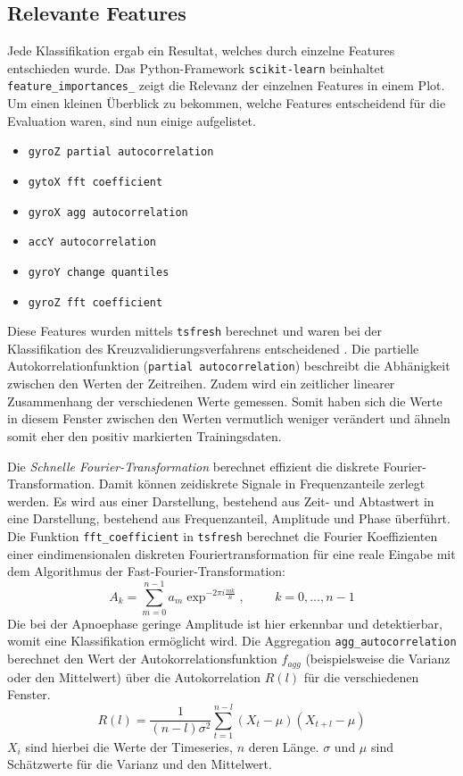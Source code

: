 \subsection{Relevante Features}
Jede Klassifikation ergab ein Resultat, welches durch einzelne Features entschieden wurde. 
Das Python-Framework \texttt{scikit-learn} beinhaltet \texttt{feature\_importances\_} zeigt die Relevanz der einzelnen Features in einem Plot.
Um einen kleinen Überblick zu bekommen, welche Features entscheidend für die Evaluation waren, sind nun einige aufgelistet.
\begin{itemize}
    \item \texttt{gyroZ partial autocorrelation}
    \item \texttt{gytoX fft coefficient}
    \item \texttt{gyroX agg autocorrelation}
    \item \texttt{accY autocorrelation}
    \item \texttt{gyroY change quantiles }
    \item \texttt{gyroZ fft coefficient}
\end{itemize}
Diese Features wurden mittels \texttt{tsfresh} berechnet und waren bei der Klassifikation des Kreuzvalidierungsverfahrens entscheidened \cite{TsfreshTsfresh12}.
Die partielle Autokorrelationfunktion (\texttt{partial autocorrelation}) beschreibt die Abhänigkeit zwischen den Werten der Zeitreihen. 
Zudem wird ein zeitlicher linearer Zusammenhang der verschiedenen Werte gemessen.
Somit haben sich die Werte in diesem Fenster zwischen den Werten vermutlich weniger verändert und ähneln somit eher den positiv markierten Trainingsdaten.

Die \textit{Schnelle Fourier-Transformation} berechnet effizient die diskrete Fourier-Transformation.
Damit können zeidiskrete Signale in Frequenzanteile zerlegt werden. 
Es wird aus einer Darstellung, bestehend aus Zeit- und Abtastwert in eine Darstellung, bestehend aus Frequenzanteil, Amplitude und Phase überführt.
Die Funktion \texttt{fft\_coefficient} in \texttt{tsfresh} berechnet die Fourier Koeffizienten einer eindimensionalen diskreten Fouriertransformation für eine reale Eingabe mit dem Algorithmus der Fast-Fourier-Transformation:
\[A_k = \sum_{m=0}^{n-1} a_m \exp ^ {-2\pi i \frac{mk}{n}}, \hspace{1cm} k = 0,\dots,n-1\]
Die bei der Apnoephase geringe Amplitude ist hier erkennbar und detektierbar, womit eine Klassifikation ermöglicht wird.
Die Aggregation \texttt{agg\_autocorrelation} berechnet den Wert der Autokorrelationsfunktion $f_{agg}$ (beispielsweise die Varianz oder den Mittelwert) über die Autokorrelation $R(l)$ für die verschiedenen Fenster. 
\[R(l) = \frac{1}{(n-l)\sigma ^2} \sum_{t=1}^{n-l} (X_t - \mu) (X_{t+l} - \mu)\]
$X_i$ sind hierbei  die Werte der Timeseries, $n$ deren Länge. 
$\sigma$ und $\mu$ sind Schätzwerte für die Varianz und den Mittelwert.

